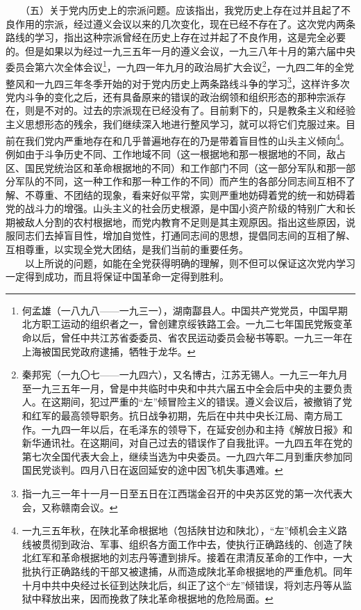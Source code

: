 \documentclass[cn,11pt,chinese]{elegantbook}
\begin{document}
　　（五）关于党内历史上的宗派问题。应该指出，我党历史上存在过并且起了不良作用的宗派，经过遵义会议以来的几次变化，现在已经不存在了。这次党内两条路线的学习，指出这种宗派曾经在历史上存在过并起了不良作用，这是完全必要的。但是如果以为经过一九三五年一月的遵义会议，一九三八年十月的第六届中央委员会第六次全体会议\footnote[9]{ 何孟雄（一八九八——一九三一），湖南酃县人。中国共产党党员，中国早期北方职工运动的组织者之一，曾创建京绥铁路工会。一九二七年国民党叛变革命以后，曾任中共江苏省委委员、省农民运动委员会秘书等职。一九三一年在上海被国民党政府逮捕，牺牲于龙华。}，一九四一年九月的政治局扩大会议\footnote[10]{ 秦邦宪（一九〇七——一九四六），又名博古，江苏无锡人。一九三一年九月至一九三五年一月，曾是中共临时中央和中共六届五中全会后中央的主要负责人。在这期间，犯过严重的“左”倾冒险主义的错误。遵义会议后，被撤销了党和红军的最高领导职务。抗日战争初期，先后在中共中央长江局、南方局工作。一九四一年以后，在毛泽东的领导下，在延安创办和主持《解放日报》和新华通讯社。在这期间，对自己过去的错误作了自我批评。一九四五年在党的第七次全国代表大会上，继续当选为中央委员。一九四六年二月到重庆参加同国民党谈判。四月八日在返回延安的途中因飞机失事遇难。}，一九四二年的全党整风和一九四三年冬季开始的对于党内历史上两条路线斗争的学习\footnote[11]{ 指一九三一年十一月一日至五日在江西瑞金召开的中央苏区党的第一次代表大会，又称赣南会议。}，这样许多次党内斗争的变化之后，还有具备原来的错误的政治纲领和组织形态的那种宗派存在，则是不对的。过去的宗派现在已经没有了。目前剩下的，只是教条主义和经验主义思想形态的残余，我们继续深入地进行整风学习，就可以将它们克服过来。目前在我们党内严重地存在和几乎普遍地存在的乃是带着盲目性的山头主义倾向\footnote[12]{ 一九三五年秋，在陕北革命根据地（包括陕甘边和陕北），“左”倾机会主义路线被贯彻到政治、军事、组织各方面工作中去，使执行正确路线的、创造了陕北红军和革命根据地的刘志丹等遭到排斥。接着在肃清反革命的工作中，一大批执行正确路线的干部又被逮捕，从而造成陕北革命根据地的严重危机。同年十月中共中央经过长征到达陕北后，纠正了这个“左”倾错误，将刘志丹等从监狱中释放出来，因而挽救了陕北革命根据地的危险局面。}。例如由于斗争历史不同、工作地域不同（这一根据地和那一根据地的不同，敌占区、国民党统治区和革命根据地的不同）和工作部门不同（这一部分军队和那一部分军队的不同，这一种工作和那一种工作的不同）而产生的各部分同志间互相不了解、不尊重、不团结的现象，看来好似平常，实则严重地妨碍着党的统一和妨碍着党的战斗力的增强。山头主义的社会历史根源，是中国小资产阶级的特别广大和长期被敌人分割的农村根据地，而党内教育不足则是其主观原因。指出这些原因，说服同志们去掉盲目性，增加自觉性，打通同志间的思想，提倡同志间的互相了解、互相尊重，以实现全党大团结，是我们当前的重要任务。\\
　　以上所说的问题，如能在全党获得明确的理解，则不但可以保证这次党内学习一定得到成功，而且将保证中国革命一定得到胜利。\\
\end{document}
